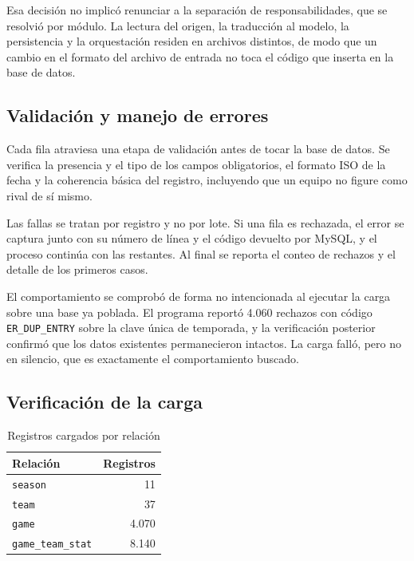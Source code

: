 \documentclass[conference]{IEEEtran}
\begin{document}
Esa decisión no implicó renunciar a la separación de responsabilidades, que se
resolvió por módulo. La lectura del origen, la traducción al modelo, la
persistencia y la orquestación residen en archivos distintos, de modo que un
cambio en el formato del archivo de entrada no toca el código que inserta en la
base de datos.

\subsection{Validación y manejo de errores}

Cada fila atraviesa una etapa de validación antes de tocar la base de datos. Se
verifica la presencia y el tipo de los campos obligatorios, el formato ISO de
la fecha y la coherencia básica del registro, incluyendo que un equipo no
figure como rival de sí mismo.

Las fallas se tratan por registro y no por lote. Si una fila es rechazada, el
error se captura junto con su número de línea y el código devuelto por MySQL, y
el proceso continúa con las restantes. Al final se reporta el conteo de
rechazos y el detalle de los primeros casos.

El comportamiento se comprobó de forma no intencionada al ejecutar la carga
sobre una base ya poblada. El programa reportó 4.060 rechazos con código
\texttt{ER\_DUP\_ENTRY} sobre la clave única de temporada, y la verificación
posterior confirmó que los datos existentes permanecieron intactos. La carga
falló, pero no en silencio, que es exactamente el comportamiento buscado.

\subsection{Verificación de la carga}

\begin{table}[htbp]
\caption{Registros cargados por relación}
\label{tab:carga}
\centering
\begin{tabular}{lr}
\toprule
\textbf{Relación} & \textbf{Registros} \\
\midrule
\texttt{season}           & 11 \\
\texttt{team}             & 37 \\
\texttt{game}             & 4.070 \\
\texttt{game\_team\_stat} & 8.140 \\
\bottomrule
\end{tabular}
\end{table}
\end{document}
